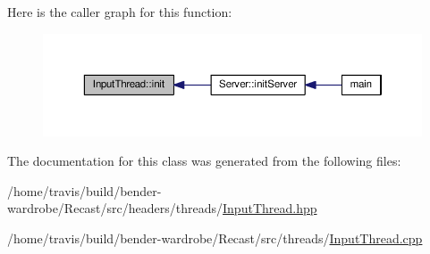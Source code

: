 Here is the caller graph for this function\-:
\nopagebreak
\begin{figure}[H]
\begin{center}
\leavevmode
\includegraphics[width=350pt]{class_input_thread_ac33f0f934c6dc40c7747b96e8b60a736_icgraph}
\end{center}
\end{figure}




The documentation for this class was generated from the following files\-:\begin{DoxyCompactItemize}
\item 
/home/travis/build/bender-\/wardrobe/\-Recast/src/headers/threads/\hyperlink{_input_thread_8hpp}{Input\-Thread.\-hpp}\item 
/home/travis/build/bender-\/wardrobe/\-Recast/src/threads/\hyperlink{_input_thread_8cpp}{Input\-Thread.\-cpp}\end{DoxyCompactItemize}
